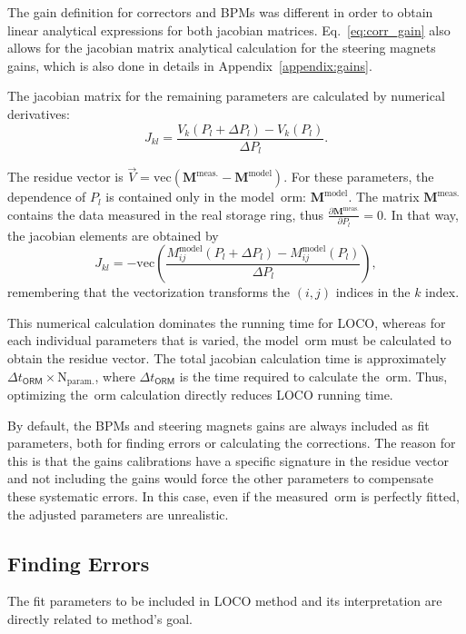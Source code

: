 The gain definition for correctors and BPMs was different in order to obtain linear analytical expressions for both jacobian matrices. Eq.~\eqref{eq:corr_gain} also allows for the jacobian matrix analytical calculation for the steering magnets gains, which is also done in details in Appendix~\ref{appendix:gains}. 

The jacobian matrix for the remaining parameters are calculated by numerical derivatives:
\begin{equation}
    J_{kl} = \dfrac{V_{k}\left(P_{l} + \Delta P_{l}\right) - V_{k}\left(P_{l}\right)}{\Delta P_{l}}.
\end{equation}

The residue vector is $\vec{V} = \mathrm{vec}\left(\mathbf{M}^{\mathrm{meas.}} - \mathbf{M}^{\mathrm{model}}\right)$. For these parameters, the dependence of $P_l$ is contained only in the model~\gls{orm}: $\mathbf{M}^{\mathrm{model}}$. The matrix $\mathbf{M}^{\mathrm{meas.}}$ contains the data measured in the real storage ring, thus $\frac{\partial\mathbf{M}^{\mathrm{meas.}}}{\partial P_l} = 0$. In that way, the jacobian elements are obtained by
\begin{equation}
    J_{kl} = -\mathrm{vec}\left(\dfrac{M_{ij}^{\mathrm{model}}\left(P_{l} + \Delta P_{l}\right) - M_{ij}^{\mathrm{model}}\left(P_{l}\right)}{\Delta P_{l}}\right),
\end{equation}
remembering that the vectorization transforms the $(i, j)$ indices in the $k$ index.

This numerical calculation dominates the running time for LOCO, whereas for each individual parameters that is varied, the model~\gls{orm} must be calculated to obtain the residue vector. The total jacobian calculation time is approximately $\Delta t_{\mathsf{ORM}} \times \mathrm{N}_{\mathrm{param.}}$, where $\Delta t_{\mathsf{ORM}}$ is the time required to calculate the~\gls{orm}. Thus, optimizing the~\gls{orm} calculation directly reduces LOCO running time. 

By default, the BPMs and steering magnets gains are always included as fit parameters, both for finding errors or calculating the corrections. The reason for this is that the gains calibrations have a specific signature in the residue vector and not including the gains would force the other parameters to compensate these systematic errors. In this case, even if the measured~\gls{orm} is perfectly fitted, the adjusted parameters are unrealistic. 
\subsection{Finding Errors}
The fit parameters to be included in LOCO method and its interpretation are directly related to method's goal.

